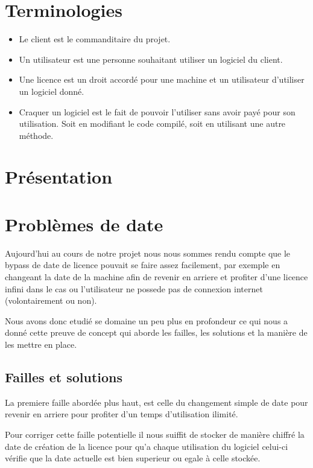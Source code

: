 \chapter{Terminologies}

\begin{itemize}
	\item Le client est le commanditaire du projet.
	\item Un utilisateur est une personne souhaitant utiliser un logiciel du client. 
	\item Une licence est un droit accordé pour une machine et un utilisateur d'utiliser un logiciel donné.
	\item Craquer un logiciel est le fait de pouvoir l'utiliser sans avoir payé pour son utilisation. 
	Soit en modifiant le code compilé, soit en utilisant une autre méthode. 
\end{itemize}

\chapter{Présentation}

\chapter{Problèmes de date}

Aujourd'hui au cours de notre projet nous nous sommes rendu compte que le bypass de 
date de licence pouvait se faire assez facilement, par exemple en changeant la date de la machine 
afin de revenir en arriere et profiter d'une licence infini dans le cas ou l'utilisateur
ne possede pas de connexion internet (volontairement ou non).\newline

Nous avons donc etudié se domaine un peu plus en profondeur ce qui nous a donné cette
preuve de concept qui aborde les failles, les solutions et la manière de les mettre en place.\newline

\section{Failles et solutions}

	La premiere faille abordée plus haut, est celle du changement simple de date pour revenir en arriere
	pour profiter d'un temps d'utilisation ilimité.\newline

	Pour corriger cette faille potentielle il nous suiffit de stocker de manière chiffré la date de création de la licence
	pour qu'a chaque utilisation du logiciel celui-ci vérifie que la date actuelle est bien superieur ou egale à celle
	stockée.\newline

